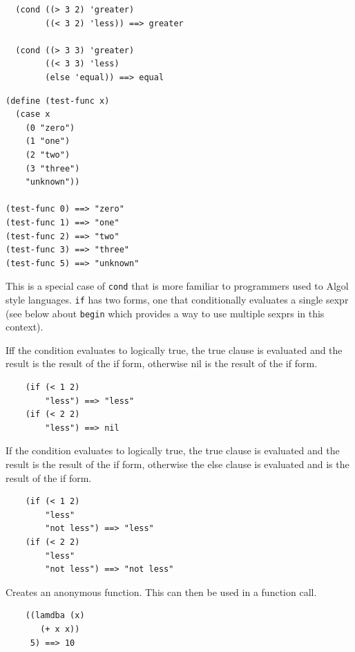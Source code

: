 \documentclass[12pt]{article}
\begin{document}
\begin{verbatim}
  (cond ((> 3 2) 'greater)
        ((< 3 2) 'less)) ==> greater

  (cond ((> 3 3) 'greater)
        ((< 3 3) 'less)
        (else 'equal)) ==> equal
\end{verbatim}


\begin{verbatim}
(define (test-func x)
  (case x
    (0 "zero")
    (1 "one")
    (2 "two")
    (3 "three")
    "unknown"))

(test-func 0) ==> "zero"
(test-func 1) ==> "one"
(test-func 2) ==> "two"
(test-func 3) ==> "three"
(test-func 5) ==> "unknown"
\end{verbatim}


This is a special case of \verb|cond| that is more familiar to
programmers used to Algol style languages. \verb|if| has two forms,
one that conditionally evaluates a single sexpr (see below about
\verb|begin| which provides a way to use multiple sexprs in this context).

Iff the condition evaluates to logically true, the true clause is
evaluated and the result is the result of the if form, otherwise nil
is the result of the if form. 

\begin{verbatim}
    (if (< 1 2) 
        "less") ==> "less"
    (if (< 2 2) 
        "less") ==> nil
\end{verbatim}


If the condition evaluates to logically true, the true clause is
evaluated and the result is the result of the if form, otherwise the
else clause is evaluated and is the result of the if form. 

\begin{verbatim}
    (if (< 1 2) 
        "less" 
        "not less") ==> "less"
    (if (< 2 2) 
        "less" 
        "not less") ==> "not less"
\end{verbatim}


Creates an anonymous function. This can then be used in a function call.

\begin{verbatim}
    ((lamdba (x) 
       (+ x x)) 
     5) ==> 10
\end{verbatim}
\end{document}
